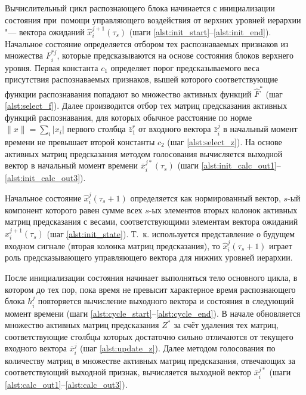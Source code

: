 Вычислительный цикл распознающего блока начинается с инициализации состояния при~помощи управляющего воздействия от верхних уровней иерархии "--- вектора ожиданий $\hat x_i^{j+1}(\tau_s)$ (шаги \ref{alst:init_start}--\ref{alst:init_end}). Начальное состояние определяется отбором тех распознаваемых признаков из множества $F_i^{*j}$, которые предсказываются на основе состояния блоков верхнего уровня. Первая константа $c_1$ определяет порог предсказываемого веса присутствия распознаваемых признаков, вышей которого соответствующие функции распознавания попадают во множество активных функций $\hat F^*$ (шаг \ref{alst:select_f}). Далее производится отбор тех матриц предсказания активных функций распознавания, для которых обычное расстояние по норме $\|x\|=\sum_i |x_i|$ первого столбца $\bar z_1^r$ от входного вектора $\bar z_i^j$ в начальный момент времени не превышает второй константы $c_2$ (шаг \ref{alst:select_z}). На основе активных матриц предсказания методом голосования вычисляется выходной вектор в начальный момент времени $\bar x_i^{j*}(\tau_s)$ (шаги \ref{alst:init_calc_out1}--\ref{alst:init_calc_out3}).
	
Начальное состояние $\hat x_i^j(\tau_s+1)$ определяется как нормированный вектор, $s$-ый компонент которого равен сумме всех $s$-ых элементов вторых колонок активных матриц предсказания с весами, соответствующими элементам вектора ожиданий $\hat x_i^{j+1}(\tau_s)$ (шаг \ref{alst:init_state}). Т.~к. используется представление о будущем входном сигнале (вторая колонка матриц предсказания), то $\hat x_i^j(\tau_s+1)$ играет роль предсказывающего управляющего вектора для нижних уровней иерархии.

После инициализации состояния начинает выполняться тело основного цикла, в котором до тех пор, пока время не превысит характерное время распознающего блока $h_i^j$ повторяется вычисление выходного вектора и состояния в следующий момент времени (шаги \ref{alst:cycle_start}--\ref{alst:cycle_end}). В начале обновляется множество активных матриц предсказания $Z^*$ за счёт удаления тех матриц, соответствующие столбцы которых достаточно сильно отличаются от текущего входного вектора $\bar x_i^j$ (шаг \ref{alst:update_z}). Далее методом голосования по количеству матриц в множестве активных матриц предсказания, отвечающих за соответствующий выходной признак, вычисляется выходной вектор $\bar x_i^{j*}$ (шаги \ref{alst:calc_out1}--\ref{alst:calc_out3}).
		
